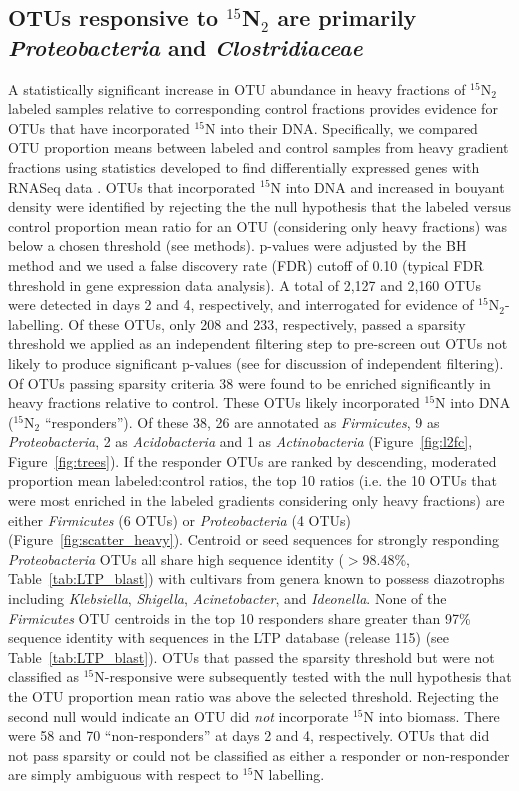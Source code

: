 \subsection{OTUs responsive to $^{15}$N$_{2}$ are primarily \textit{Proteobacteria}
and \textit{Clostridiaceae}}
A statistically significant increase in OTU abundance in heavy fractions of
$^{15}$N$_{2}$ labeled samples relative to corresponding control fractions
provides evidence for OTUs that have incorporated $^{15}$N into their DNA.
Specifically, we compared OTU proportion means between labeled and control
samples from heavy gradient fractions using statistics developed to find
differentially expressed genes with RNASeq data \citep{24699258, Love_2014}.
OTUs that incorporated $^{15}$N into DNA and increased in bouyant density were
identified by rejecting the the null hypothesis that the labeled versus control
proportion mean ratio for an OTU (considering only heavy fractions) was below a
chosen threshold (see methods). p-values were adjusted by the BH method
\citep{citeulike:1042553} and we used a false discovery rate (FDR) cutoff of
0.10 (typical FDR threshold in gene expression data analysis). A total of 2,127
and 2,160 OTUs were detected in days 2 and 4, respectively, and interrogated
for evidence of $^{15}$N$_{2}$-labelling. Of these OTUs, only 208 and 233,
respectively, passed a sparsity threshold we applied as an independent
filtering step to pre-screen out OTUs not likely to produce significant
p-values (see \citet{Love_2014} for discussion of independent filtering). Of
OTUs passing sparsity criteria 38 were found to be enriched significantly in
heavy fractions relative to control. These OTUs likely incorporated $^{15}$N
into DNA ($^{15}$N$_{2}$ ``responders''). Of these 38, 26 are annotated as
\textit{Firmicutes}, 9 as \textit{Proteobacteria}, 2 as \textit{Acidobacteria}
and 1 as \textit{Actinobacteria} (Figure~\ref{fig:l2fc},
Figure~\ref{fig:trees}). If the responder OTUs are ranked by descending,
moderated proportion mean labeled:control ratios, the top 10 ratios (i.e. the
10 OTUs that were most enriched in the labeled gradients considering only heavy
fractions) are either \textit{Firmicutes} (6 OTUs) or \textit{Proteobacteria}
(4 OTUs) (Figure~\ref{fig:scatter_heavy}). Centroid or seed sequences for
strongly responding \textit{Proteobacteria} OTUs all share high sequence
identity ($>$98.48\%, Table~\ref{tab:LTP_blast}) with cultivars from genera
known to possess diazotrophs including \textit{Klebsiella}, \textit{Shigella},
\textit{Acinetobacter}, and \textit{Ideonella}. None of the \textit{Firmicutes}
OTU centroids in the top 10 responders share greater than 97\% sequence
identity with sequences in the LTP database (release 115) (see
Table~\ref{tab:LTP_blast}).  OTUs that passed the sparsity threshold but were
not classified as $^{15}$N-responsive were subsequently tested with the null
hypothesis that the OTU proportion mean ratio was above the selected threshold.
Rejecting the second null would indicate an OTU did \textit{not} incorporate
$^{15}$N into biomass. There were 58 and 70 ``non-responders'' at days 2 and 4,
respectively. OTUs that did not pass sparsity or could not be classified as
either a responder or non-responder are simply ambiguous with respect to
$^{15}$N labelling.

